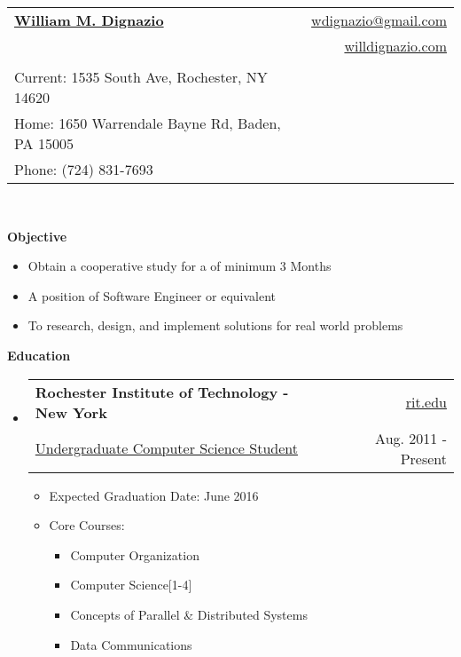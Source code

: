 \documentclass[letterpaper,11pt]{article}
\makeatletter
\newcommand{\resheading}[1]{{\large \colorbox{mygrey}{\begin{minipage}{\textwidth}{\textbf{#1 \vphantom{p\^{E}}}}\end{minipage}}}}
\newcommand{\ressubheading}[4]{
\begin{tabular*}{6.5in}{l@{\extracolsep{\fill}}r}
		\textbf{#1} & #2 \\
		{#3} & {#4} \\
\end{tabular*}\vspace{-6pt}}
\makeatother
\begin{document}
 

\thispagestyle{empty}
\pagestyle{empty}

\newcommand{\mywebheader}{
\begin{tabular*}{7in}{l@{\extracolsep{\fill}}r} \\
	\textbf{\href{http://www.willdignazio.com/}{\large William M. Dignazio}} & \href{mailto:wdignazio@gmail.com}{wdignazio@gmail.com}\\ &
	\href{http://willdignazio.com/}{willdignazio.com} \\ \vspace{-10mm} \\
	{\footnotesize {{Current: 1535 South Ave,
Rochester, NY 14620}}} & \\
	{\footnotesize {{Home: 1650 Warrendale Bayne Rd, Baden, PA 15005}}} & \\
	{\footnotesize {{Phone: (724) 831-7693}}} 	\end{tabular*}
\\
\vspace{0.1in}}

\mywebheader

\resheading{Objective}
{
	\footnotesize
	\begin{itemize}
		\item{Obtain a cooperative study for a of minimum 3 Months}
		\item{A position of Software Engineer or equivalent}
		\item{To research, design, and implement solutions for real world problems}
	\end{itemize}
}
\resheading{Education}
	{ \footnotesize
	\begin{itemize}
		\item
			\ressubheading{Rochester Institute of Technology - New York}{\href{http://www.rit.edu}{rit.edu}}{\href{http://www.cs.rit.edu/}{Undergraduate Computer Science Student}}{Aug. 2011 - Present}
				{ \footnotesize
				\begin{itemize}
					\item{Expected Graduation Date: June 2016}
					\item{Core Courses:}
						\begin{itemize}
							\item{Computer Organization}
							\item{Computer Science[1-4]}
							\item{Concepts of Parallel \& Distributed Systems}
							\item{Data Communications}
						\end{itemize}
				\end{itemize}
				}
	\end{itemize} %
	}
\end{document}
